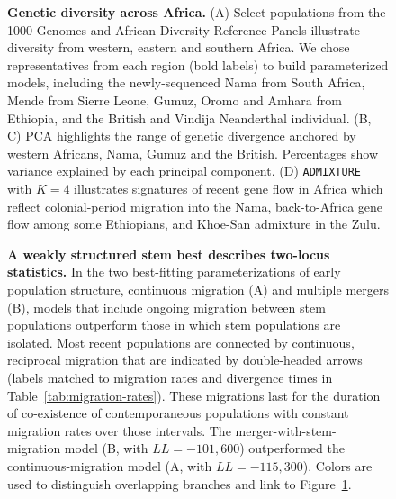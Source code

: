 \documentclass[]{article}
\begin{document}
\begin{figure}[ht!]
    \centering
    \caption[width=\textwidth]{
        \textbf{Genetic diversity across Africa.}
        (A) Select populations from the 1000 Genomes and African Diversity Reference Panels
        illustrate diversity from western, eastern and southern Africa.
        We chose representatives from each region (bold labels)
        to build parameterized models,
        including the newly-sequenced Nama from South Africa, Mende
        from Sierre Leone, Gumuz, Oromo and Amhara from Ethiopia, and the
        British and Vindija Neanderthal individual.
        (B, C) PCA highlights the range of genetic divergence anchored 
        by western Africans, Nama, Gumuz and the British.
        Percentages show variance explained by each principal component.
        (D) \texttt{ADMIXTURE} with $K=4$ illustrates signatures of recent gene flow in Africa
        which reflect colonial-period migration into the Nama,
        back-to-Africa gene flow among some Ethiopians, and Khoe-San admixture in the Zulu.
    }
    \label{fig:diversity}
\end{figure}
 
\begin{figure}[t!]
    \centering
    \caption{
        \textbf{A weakly structured stem best describes two-locus statistics.}
        In the two best-fitting parameterizations of early population structure,
        continuous migration (A) and multiple mergers (B), models
        that include ongoing migration between stem populations outperform
        those in which stem populations are isolated. Most recent populations are
        connected by continuous, reciprocal migration that are indicated by 
        double-headed arrows (labels matched to migration rates and divergence
        times in Table~\ref{tab:migration-rates}). These migrations last for the
        duration of co-existence of contemporaneous populations with constant
        migration rates over those intervals. The
        merger-with-stem-migration model (B, with  $LL=-101,600$) outperformed the
        continuous-migration model (A, with $LL=-115,300$).
        Colors are used to distinguish overlapping branches and link to
        Figure~\ref{fig:diversity}.}
    \label{fig:best-fit-models}
\end{figure}
\end{document}
